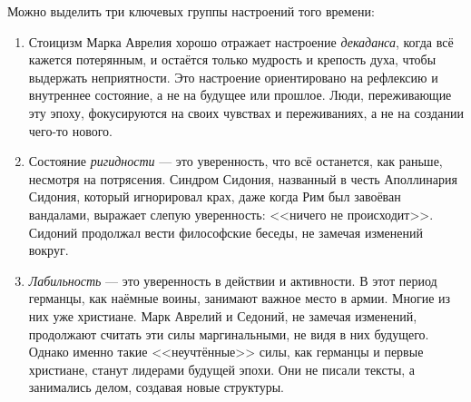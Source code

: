 Можно выделить три ключевых группы настроений того времени:
\begin{enumerate}
    \item Стоицизм Марка Аврелия хорошо отражает настроение \textit{декаданса}, когда всё кажется потерянным, и остаётся только мудрость и крепость духа, чтобы выдержать неприятности. Это настроение ориентировано на рефлексию и внутреннее состояние, а не на будущее или прошлое. Люди, переживающие эту эпоху, фокусируются на своих чувствах и переживаниях, а не на создании чего-то нового.
    \item Состояние \textit{ригидности} --- это уверенность, что всё останется, как раньше, несмотря на потрясения. Синдром Сидония, названный в честь Аполлинария Сидония, который игнорировал крах, даже когда Рим был завоёван вандалами, выражает слепую уверенность: <<ничего не происходит>>. Сидоний продолжал вести философские беседы, не замечая изменений вокруг.
    \item \textit{Лабильность} --- это уверенность в действии и активности. В этот период германцы, как наёмные воины, занимают важное место в армии. Многие из них уже христиане. Марк Аврелий и Седоний, не замечая изменений, продолжают считать эти силы маргинальными, не видя в них будущего. Однако именно такие <<неучтённые>> силы, как германцы и первые христиане, станут лидерами будущей эпохи. Они не писали тексты, а занимались делом, создавая новые структуры.
\end{enumerate}

 

